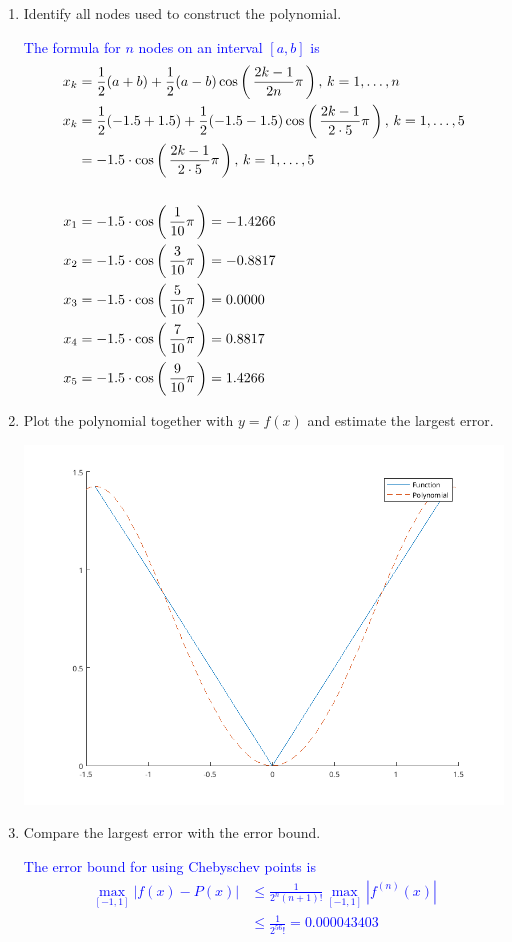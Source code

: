 \documentclass[10pt,a4paper]{report}
\newcommand{\BLUE}[1]{\textcolor{blue}{#1}}
\begin{document}
\begin{enumerate}[label=(\alph*)]

	\item Identify all nodes used to construct the polynomial.
	
	\BLUE{The formula for $n$ nodes on an interval $[a,b]$ is
	\begin{align*}
		x_k &= \frac{1}{2}(a+b)+\frac{1}{2}(a-b)\cos\left (\, \frac{2k-1}{2n}\pi \,\right ), \, k=1,\dots,n \\
		x_k &= \frac{1}{2}(-1.5+1.5)+\frac{1}{2}(-1.5-1.5)\cos\left (\, \frac{2k-1}{2\cdot 5}\pi \,\right ), \, k=1,\dots,5 \\
		&= -1.5\cdot\cos\left (\, \frac{2k-1}{2\cdot 5}\pi \,\right ), \, k=1,\dots,5 \\
		\\
		x_1 &= -1.5\cdot \cos\left (\, \frac{1}{10}\pi \,\right ) = -1.4266 \\
		x_2 &= -1.5\cdot \cos\left (\, \frac{3}{10}\pi \,\right ) =   -0.8817  \\
		x_3 &= -1.5\cdot \cos\left (\, \frac{5}{10}\pi \,\right ) = 0.0000   \\
		x_4 &= -1.5\cdot \cos\left (\, \frac{7}{10}\pi \,\right ) =  0.8817  \\
		x_5 &= -1.5\cdot \cos\left (\, \frac{9}{10}\pi \,\right ) =    1.4266
	\end{align*}
	}
	\item Plot the polynomial together with $y=f(x)$ and estimate the largest error.
	
	\includegraphics[scale=0.4]{530102b.png} 	
	
	\item Compare the largest error with the error bound.
	
	\BLUE{The error bound for using Chebyschev points is 
	\begin{align*}
		\max_{[-1,1]}|f(x)-P(x)| &\le \frac{1}{2^n(n+1)!}\max_{[-1,1]} |f^{(n)}(x)| \\
		&\le \frac{1}{2^56!} = 0.000043403
	\end{align*}
	}

\end{enumerate}
\end{document}
